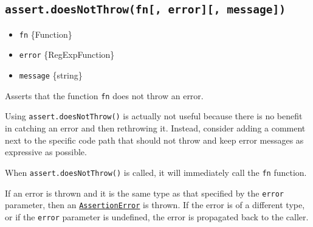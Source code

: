 \begin{Shaded}
\begin{Highlighting}[]
\OperatorTok{=} \NormalTok{(}\NormalTok{)}\OperatorTok{;}

\NormalTok{(}\NormalTok{(} \NormalTok{(}\NormalTok{)))}
  \NormalTok{(() }\KeywordTok{=\textgreater{}}\NormalTok{ \{}
\NormalTok{  \})}\OperatorTok{;}
\end{Highlighting}
\end{Shaded}

\subsection{\texorpdfstring{\texttt{assert.doesNotThrow(fn{[},\ error{]}{[},\ message{]})}}{assert.doesNotThrow(fn{[}, error{]}{[}, message{]})}}\label{assert.doesnotthrowfn-error-message}

\begin{itemize}
\tightlist
\item
  \texttt{fn} \{Function\}
\item
  \texttt{error} \{RegExp\textbar Function\}
\item
  \texttt{message} \{string\}
\end{itemize}

Asserts that the function \texttt{fn} does not throw an error.

Using \texttt{assert.doesNotThrow()} is actually not useful because
there is no benefit in catching an error and then rethrowing it.
Instead, consider adding a comment next to the specific code path that
should not throw and keep error messages as expressive as possible.

When \texttt{assert.doesNotThrow()} is called, it will immediately call
the \texttt{fn} function.

If an error is thrown and it is the same type as that specified by the
\texttt{error} parameter, then an
\hyperref[class-assertassertionerror]{\texttt{AssertionError}} is
thrown. If the error is of a different type, or if the \texttt{error}
parameter is undefined, the error is propagated back to the caller.


